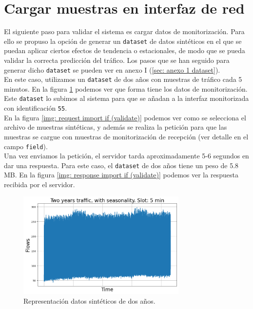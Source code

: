\documentclass[a4paper, oneside, 12pt]{book}
\begin{document}
	\section{Cargar muestras en interfaz de red}
	\label{sec: load data if}
	
	\noindent El siguiente paso para validar el sistema es cargar datos de monitorización. Para ello se propuso la opción de generar un \texttt{dataset} de datos sintéticos en el que se puedan aplicar ciertos efectos de tendencia o estacionales, de modo que se pueda validar la correcta predicción del tráfico. Los pasos que se han seguido para generar dicho \texttt{dataset} se pueden ver en anexo I (\ref{sec: anexo 1 dataset}). \\
	
	\noindent En este caso, utilizamos un \texttt{dataset} de dos años con muestras de tráfico cada 5 minutos. En la figura \ref{img: synthetic dataset two year} podemos ver que forma tiene los datos de monitorización. Este \texttt{dataset} lo subimos al sistema para que se añadan a la interfaz monitorizada con identificación \texttt{55}. \\
	
	\noindent En la figura \ref{img: request import if (validate)} podemos ver como se selecciona el archivo de muestras sintéticas, y además se realiza la petición para que las muestras se cargue con muestras de monitorización de recepción (ver detalle en el campo \texttt{field}). \\
	
	\noindent Una vez enviamos la petición, el servidor tarda aproximadamente 5-6 segundos en dar una respuesta. Para este caso, el \texttt{dataset} de dos años tiene un peso de 5.8 MB. En la figura \ref{img: response import if (validate)} podemos ver la respuesta recibida por el servidor. \\
	
	\pagebreak

	\begin{figure}[h!]
		\begin{center}
			\includegraphics[width=0.75\textwidth]{img/dataset_synt_1.png}
			\caption{Representación datos sintéticos de dos años.}
			\label{img: synthetic dataset two year}
		\end{center}
	\end{figure}
	
\end{document}
